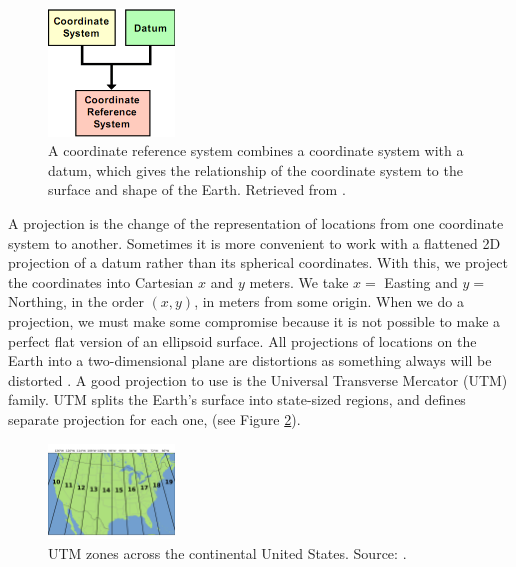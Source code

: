 \begin{figure}[h!]
	\centering
	\includegraphics[width=0.3\textwidth]{Figures/coordinate system-datum_nikolli2011.png}
	\caption{A coordinate reference system combines a coordinate system with a datum, which gives the relationship of the coordinate system to the surface and shape of the Earth. Retrieved from \cite{nikolli_CRS_2011}.
		\label{fig:crs-datum}}
\end{figure}

A projection is the change of the representation of locations from one coordinate system to another. Sometimes it is more convenient to work with a flattened 2D projection of a datum rather than its spherical coordinates. With this, we project the coordinates into Cartesian $x$ and $y$ meters. We take $x=$ Easting and $y=$ Northing, in the order $(x, y)$, in meters from some origin. When we do a projection, we must make some compromise because it is not possible to make a perfect flat version of an ellipsoid surface. All projections of locations on the Earth into a two-dimensional plane are distortions as something always will be distorted \cite{lapaine_choosing_2017}. A good projection to use  is  the Universal Transverse Mercator (UTM) family. UTM splits the Earth's surface into state-sized regions, and defines separate projection for each one,  (see Figure \ref{fig:utm-zones}).

\begin{figure}[h!]
	\centering
	\includegraphics[width=0.3\textwidth]{Figures/UTM-zones.png}
	\caption{UTM zones across the continental United States. Source: \cite{chrismurf_2009}.
		\label{fig:utm-zones}}
\end{figure}


